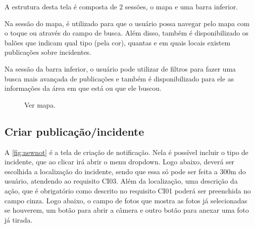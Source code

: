 \documentclass[12pt]{article}
\begin{document}
A estrutura desta tela é composta de 2 sessões, o mapa e uma barra inferior. 

Na sessão do mapa, é utilizado para que o usuário possa navegar pelo mapa com o toque ou através do campo de busca. Além disso, também é disponibilizado os balões que indicam qual tipo (pela cor), quantas e em quais locais existem publicações sobre incidentes.

Na sessão da barra inferior, o usuário pode utilizar de filtros para fazer uma busca mais avançada de publicações e também é disponibilizado para ele as informações da área em que está ou que ele buscou.



\begin{figure}[h!]
  \caption{Ver mapa.}
  \label{fig:vermapa}
\end{figure} 
\vfill%
\pagebreak%

\subsection{Criar publicação/incidente}\label{subsec:SeccriaInci}

A \ref{fig:newnot} é a tela de criação de notificação. Nela é possível incluir o tipo de incidente, que ao clicar irá abrir o menu dropdown. Logo abaixo, deverá ser escolhida a localização do incidente, sendo que essa só pode ser feita a 300m do usuário, atendendo ao requisito CI03. 
Além da localização, uma descrição da ação, que é obrigatório como descrito no requisito CI01 poderá ser preenchida no campo cinza.
Logo abaixo, o campo de fotos que mostra as fotos já selecionadas se houverem, um botão para abrir a câmera e outro botão para anexar uma foto já tirada.
\end{document}
